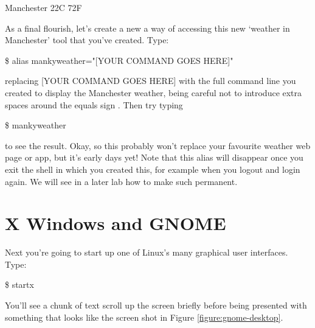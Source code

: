 \begin{ttoutenv}
   [33]Manchester 22\textdegree{}C 72\textdegree{}F
\end{ttoutenv}

As a final flourish, let's create a new a way of accessing this new `weather in Manchester' tool that you've created. Type:

\begin{ttoutenv}
\$ alias mankyweather="[YOUR COMMAND GOES HERE]"
\end{ttoutenv}

replacing [YOUR COMMAND GOES HERE] with the full command line you created to display the Manchester weather, being careful not to introduce extra spaces around the equals sign \ttout{=}. Then try typing

\begin{ttoutenv}
\$ mankyweather
\end{ttoutenv}


to see the result. Okay, so this probably won't replace your favourite weather web page or app, but it's early days yet! 
Note that this alias will disappear once you exit the shell in which you created this, for example when you logout and login again. We will see in a later lab how to make such  permanent.


\section{X Windows and GNOME} 

Next you're going to start up one of Linux's many graphical user interfaces. Type:

\begin{ttoutenv}
\$ startx
\end{ttoutenv}


You'll see a chunk of text scroll up the screen briefly before being presented with something that looks like the screen shot in Figure \ref{figure:gnome-desktop}.

